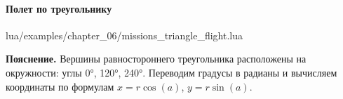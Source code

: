 \paragraph{Полет по треугольнику}
\begin{codefile}{lua/examples/chapter_06/missions_triangle_flight.lua}
\end{codefile}
\textbf{Пояснение.} Вершины равностороннего треугольника расположены на окружности: углы 0°, 120°, 240°. Переводим градусы в радианы и вычисляем координаты по формулам \(x = r \cos(a)\), \(y = r \sin(a)\).

